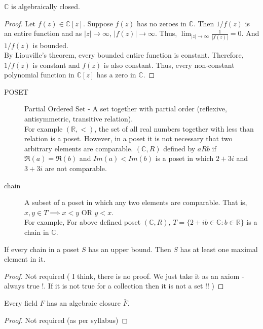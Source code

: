 \begin{theorem}
	$\mathbb{C}$ is algebraically closed.
\end{theorem}
\begin{proof}
	Let $f(z) \in \mathbb{C}[z]$.
	Suppose $f(z)$ has no zeroes in $\mathbb{C}$.
	Then $1/f(z)$ is an entire function and as $|z| \to \infty$, $|f(z)| \to \infty$.
	Thus, $\lim_{|z|\to\infty} \frac{1}{|f(z)|} = 0$.
	And $1/f(z)$ is bounded.\\
	
	By Liouville's theorem, every bounded entire function is constant.
	Therefore, $1/f(z)$ is constant and $f(z)$ is also constant.
	Thus, every non-constant polynomial function in $\mathbb{C}[z]$ has a zero in $\mathbb{C}$.
\end{proof}

\begin{description}
	\item[POSET] Partial Ordered Set - A set together with partial order (reflexive, antisymmetric, transitive relation).\\
		
	For example $(\mathbb{R},<)$, the set of all real numbers together with less than relation is a poset.
		However, in a poset it is not necessary that two arbitrary elements are comparable.
		$(\mathbb{C},R)$ defined by $aRb$ if $\Re(a) = \Re(b)$ and $Im(a) < Im(b)$ is a poset in which $2+3i$ and $3+3i$ are not comparable.
	\item[chain] A subset of a poset in which any two elements are comparable.
		That is, $x,y \in T \implies x < y \text{ OR } y < x$.\\

	For example, For above defined poset $(\mathbb{C},R)$, $T = \{ 2+ib \in \mathbb{C} : b \in \mathbb{R} \}$ is a chain in $\mathbb{C}$.
\end{description}
\begin{lemma}[Zorn]
	If every chain in a poset $S$ has an upper bound.
	Then $S$ has at least one maximal element in it.
\end{lemma}
\begin{proof}
	Not required ( I think, there is no proof.
	We just take it as an axiom - always true !.
	If it is not true for a collection then it is not a set !! )
\end{proof}
\begin{theorem}
	Every field $F$ has an algebraic closure $\bar{F}$.
\end{theorem}
\begin{proof}
	Not required (as per syllabus)
\end{proof}

